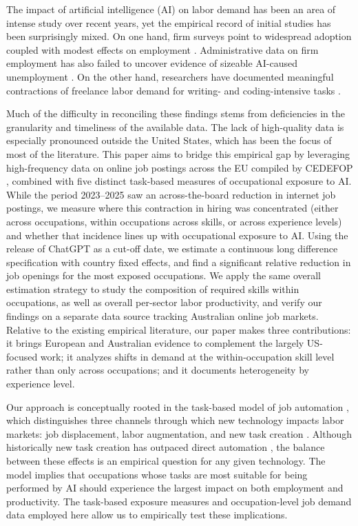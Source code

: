 \documentclass[11pt]{article}
\begin{document}
The impact of artificial intelligence (AI) on labor demand has been an area of intense study over recent years, yet the empirical record of initial studies has been surprisingly mixed. On one hand, firm surveys point to widespread adoption coupled with modest effects on employment \citep{yotzov2026firmdata}. Administrative data on firm employment has also failed to uncover evidence of sizeable AI-caused unemployment \citep{humlum2025stillwaters}. On the other hand, researchers have documented meaningful contractions of freelance labor demand for writing- and coding-intensive tasks \citep{demirci2025replacing, hui2023shortterm}.

Much of the difficulty in reconciling these findings stems from deficiencies in the granularity and timeliness of the available data. The lack of high-quality data is especially pronounced outside the United States, which has been the focus of most of the literature. This paper aims to bridge this empirical gap by leveraging high-frequency data on online job postings across the EU compiled by CEDEFOP \citep{cedefop_skills_ovate}, combined with five distinct task-based measures of occupational exposure to AI. While the period 2023--2025 saw an across-the-board reduction in internet job postings, we measure where this contraction in hiring was concentrated (either across occupations, within occupations across skills, or across experience levels) and whether that incidence lines up with occupational exposure to AI. Using the release of ChatGPT as a cut-off date, we estimate a continuous long difference specification with country fixed effects, and find a significant relative reduction in job openings for the most exposed occupations. We apply the same overall estimation strategy to study the composition of required skills within occupations, as well as overall per-sector labor productivity, and verify our findings on a separate data source tracking Australian online job markets. Relative to the existing empirical literature, our paper makes three contributions: it brings European and Australian evidence to complement the largely US-focused work; it analyzes shifts in demand at the within-occupation skill level rather than only across occupations; and it documents heterogeneity by experience level.

Our approach is conceptually rooted in the task-based model of job automation \citep{zeira1998workers, acemoglu_restrepo_2018}, which distinguishes three channels through which new technology impacts labor markets: job displacement, labor augmentation, and new task creation \citep{acemoglu_automation_2019}. Although historically new task creation has outpaced direct automation \citep{autor_outpace}, the balance between these effects is an empirical question for any given technology. The model implies that occupations whose tasks are most suitable for being performed by AI should experience the largest impact on both employment and productivity. The task-based exposure measures and occupation-level job demand data employed here allow us to empirically test these implications.
\end{document}
